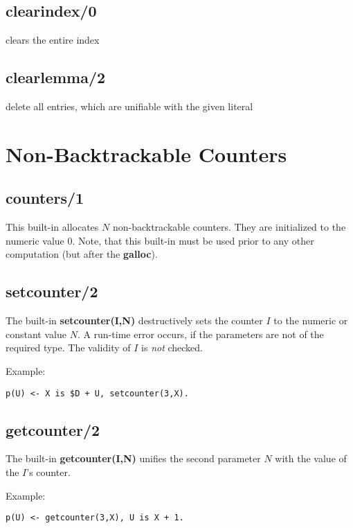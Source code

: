 \subsection{clearindex/0}
clears the entire index
\subsection{clearlemma/2}
delete all entries, which are unifiable with the given literal

\section{Non-Backtrackable Counters}

\subsection{counters/1}
This built-in allocates $N$ non-backtrackable counters. They are
initialized to the numeric value $0$.
Note, that this built-in must be used prior to any other computation
(but after the {\bf galloc}).

\subsection{setcounter/2}

The built-in {\bf setcounter(I,N)} destructively sets the counter $I$
to the numeric or constant value $N$. A run-time error occurs, if
the parameters are not of the required type.
The validity of $I$ is {\em not\/} checked.

Example:
\begin{verbatim}
p(U) <- X is $D + U, setcounter(3,X).
\end{verbatim}

\subsection{getcounter/2}

The built-in {\bf getcounter(I,N)} unifies the second parameter $N$
with the value of the $I$'s counter.

Example:
\begin{verbatim}
p(U) <- getcounter(3,X), U is X + 1.
\end{verbatim}

